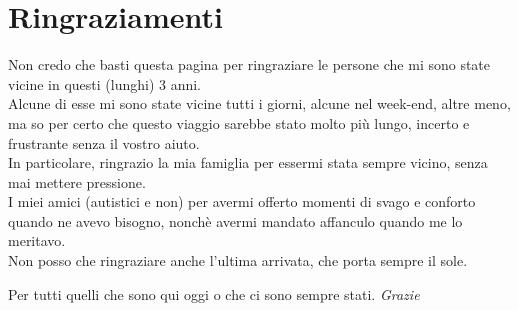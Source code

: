 
\chapter*{Ringraziamenti}

Non credo che basti questa pagina per ringraziare le persone che mi sono state vicine in questi (lunghi) 3 anni.\\
Alcune di esse mi sono state vicine tutti i giorni, alcune nel week-end, altre meno, ma so per certo che questo viaggio sarebbe stato molto più lungo, incerto e frustrante senza il vostro aiuto.
\\

\noindent In particolare, ringrazio la mia famiglia per essermi stata sempre vicino, senza mai mettere pressione.\\
I miei amici (autistici e non) per avermi offerto momenti di svago e conforto quando ne avevo bisogno, nonchè avermi mandato affanculo quando me lo meritavo.
\\
Non posso che ringraziare anche l'ultima arrivata, che porta sempre il sole.
\\
\vspace{0.3cm}
\begin{center}
Per tutti quelli che sono qui oggi o che ci sono sempre stati. \textit{Grazie}
\end{center}


